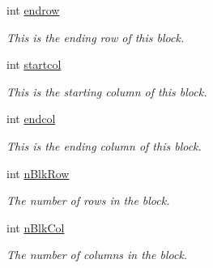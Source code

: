 \begin{DoxyCompactItemize}
int \hyperlink{classJKBuilder_1_1DistributedMatrix_ac7e765f729497d4e56e0d42c5ed012a5}{endrow}
\begin{DoxyCompactList}\small\item\em This is the ending row of this block. \item\end{DoxyCompactList}\item 
int \hyperlink{classJKBuilder_1_1DistributedMatrix_a5eb542e8d134d383869bad22b844803c}{startcol}
\begin{DoxyCompactList}\small\item\em This is the starting column of this block. \item\end{DoxyCompactList}\item 
int \hyperlink{classJKBuilder_1_1DistributedMatrix_a7e502d765772134f83b51fe10b920003}{endcol}
\begin{DoxyCompactList}\small\item\em This is the ending column of this block. \item\end{DoxyCompactList}\item 
int \hyperlink{classJKBuilder_1_1DistributedMatrix_ab2111652d429fab8c160bfbec8c6b5fb}{nBlkRow}
\begin{DoxyCompactList}\small\item\em The number of rows in the block. \item\end{DoxyCompactList}\item 
int \hyperlink{classJKBuilder_1_1DistributedMatrix_aa66940e3557e3b5bb5f1b3b4b2dbc013}{nBlkCol}
\begin{DoxyCompactList}\small\item\em The number of columns in the block. \item\end{DoxyCompactList}\end{DoxyCompactItemize}


